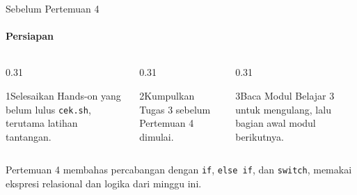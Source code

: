 \documentclass[t]{beamer}
\begin{document}
\begin{frame}{Sebelum Pertemuan 4}
\framesubtitle{Persiapan}
\begin{columns}[T]
\begin{column}{0.31\textwidth}
\begin{Langkah}{1}{Selesaikan}
Hands-on yang belum lulus \texttt{cek.sh}, terutama latihan tantangan.
\end{Langkah}
\end{column}
\begin{column}{0.31\textwidth}
\begin{Langkah}{2}{Kumpulkan}
Tugas 3 sebelum Pertemuan 4 dimulai.
\end{Langkah}
\end{column}
\begin{column}{0.31\textwidth}
\begin{Langkah}{3}{Baca}
Modul Belajar 3 untuk mengulang, lalu bagian awal modul berikutnya.
\end{Langkah}
\end{column}
\end{columns}
\vspace{10pt}
Pertemuan 4 membahas percabangan dengan \texttt{if}, \texttt{else if}, dan \texttt{switch}, memakai ekspresi relasional dan logika dari minggu ini.
\end{frame}

\end{document}
